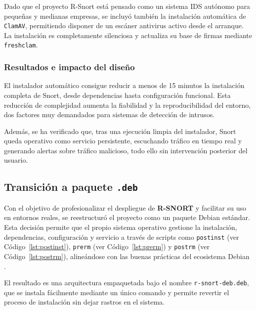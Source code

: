 \documentclass[11pt,a4paper,twoside]{report}
\begin{document}
Dado que el proyecto R-Snort está pensado como un sistema IDS autónomo para pequeñas y medianas empresas, se incluyó también la instalación automática de \texttt{ClamAV}, permitiendo disponer de un escáner antivirus activo desde el arranque. La instalación es completamente silenciosa y actualiza su base de firmas mediante \texttt{freshclam}.

\subsubsection{Resultados e impacto del diseño}

El instalador automático consigue reducir a menos de 15 minutos la instalación completa de Snort, desde dependencias hasta configuración funcional. Esta reducción de complejidad aumenta la fiabilidad y la reproducibilidad del entorno, dos factores muy demandados para sistemas de detección de intrusos.\newline

Además, se ha verificado que, tras una ejecución limpia del instalador, Snort queda operativo como servicio persistente, escuchando tráfico en tiempo real y generando alertas sobre tráfico malicioso, todo ello sin intervención posterior del usuario.

\pagebreak


\subsection{Transición a paquete \texttt{.deb}}

Con el objetivo de profesionalizar el despliegue de \textbf{R-SNORT} y facilitar su uso en entornos reales, se reestructuró el proyecto como un paquete Debian estándar. Esta decisión permite que el propio sistema operativo gestione la instalación, dependencias, configuración y servicio a través de scripts como \texttt{postinst} (ver Código~\ref{lst:postinst}), \texttt{prerm} (ver Código~\ref{lst:prerm}) y \texttt{postrm} (ver Código~\ref{lst:postrm}), alineándose con las buenas prácticas del ecosistema Debian \cite{debian_packaging_guide}.
\newline

El resultado es una arquitectura empaquetada bajo el nombre \texttt{r-snort-deb.deb}, que se instala fácilmente mediante un único comando y permite revertir el proceso de instalación sin dejar rastros en el sistema.
\end{document}
